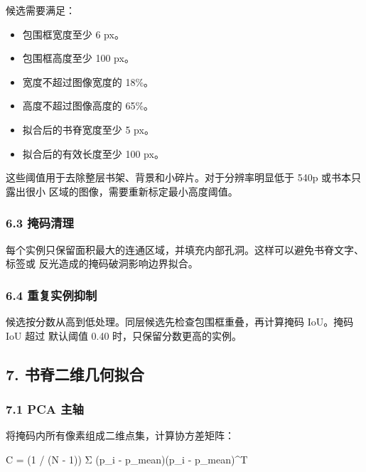 \documentclass[
  chinese,
  11pt,
  a4paper,
]{article}
\newenvironment{Shaded}{\begin{snugshade}}{\end{snugshade}}
\newcommand{\NormalTok}[1]{#1}
\providecommand{\tightlist}{%
  \setlength{\itemsep}{0pt}\setlength{\parskip}{0pt}}
\begin{document}
候选需要满足：

\begin{itemize}
\tightlist
\item
  包围框宽度至少 6 px。
\item
  包围框高度至少 100 px。
\item
  宽度不超过图像宽度的 18\%。
\item
  高度不超过图像高度的 65\%。
\item
  拟合后的书脊宽度至少 5 px。
\item
  拟合后的有效长度至少 100 px。
\end{itemize}

这些阈值用于去除整层书架、背景和小碎片。对于分辨率明显低于 540p
或书本只露出很小 区域的图像，需要重新标定最小高度阈值。

\subsubsection{6.3 掩码清理}\label{63-ux63a9ux7801ux6e05ux7406}

每个实例只保留面积最大的连通区域，并填充内部孔洞。这样可以避免书脊文字、标签或
反光造成的掩码破洞影响边界拟合。

\subsubsection{6.4
重复实例抑制}\label{64-ux91cdux590dux5b9eux4f8bux6291ux5236}

候选按分数从高到低处理。同层候选先检查包围框重叠，再计算掩码 IoU。掩码
IoU 超过 默认阈值 0.40 时，只保留分数更高的实例。

\subsection{7.
书脊二维几何拟合}\label{7-ux4e66ux810aux4e8cux7ef4ux51e0ux4f55ux62dfux5408}

\subsubsection{7.1 PCA 主轴}\label{71-pca-ux4e3bux8f74}

将掩码内所有像素组成二维点集，计算协方差矩阵：

\begin{Shaded}
\begin{Highlighting}[]
\NormalTok{C = (1 / (N {-} 1)) Σ (p\_i {-} p\_mean)(p\_i {-} p\_mean)\^{}T}
\end{Highlighting}
\end{Shaded}
\end{document}
